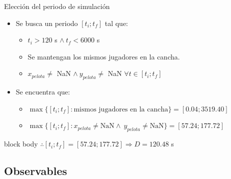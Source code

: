 \documentclass{beamer}
\begin{document}
            \begin{frame}{Elección del periodo de simulación}
                \begin{itemize}
                    \item Se busca un periodo \alert{$[t_i ; t_f]$} tal que:
                    \begin{itemize}
                        \item $t_i > 120$ s $\land\ t_f < 6000$ s
                        \item Se mantengan los mismos jugadores en la cancha.
                        \item $x_{pelota} \ne$ NaN $\land\ y_{pelota} \ne$ NaN $\forall t \in [t_i ; t_f]$
                    \end{itemize}
                    \item Se encuentra que:
                    \begin{itemize}
                        \item $\max\{[t_i ; t_f] : \text{mismos jugadores en la cancha}\} = [0.04 ; 3519.40]$
                        \item $\max\{[t_i ; t_f] : x_{pelota} \ne \text{NaN} \land\ y_{pelota} \ne \text{NaN}\} = [57.24 ; 177.72]$
                    \end{itemize}
                \end{itemize}
                \begin{beamercolorbox}[sep=5pt,center]{block body}
                    \centering
                    $\therefore [t_i ; t_f] = [57.24 ; 177.72] \Rightarrow D = 120.48$ s
                \end{beamercolorbox}
            \end{frame}

        \subsection{Observables}
\end{document}
